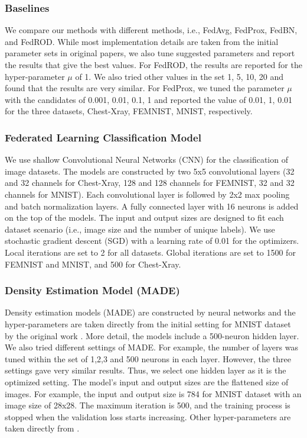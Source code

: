 \subsubsection{Baselines}
We compare our methods with different methods, i.e., FedAvg, FedProx, FedBN, and FedROD. While most implementation details are taken from the initial parameter sets in original papers, we also tune suggested parameters and report the results that give the best values. For FedROD, the results are reported for the hyper-parameter $\mu$ of 1. We also tried other values in the set {1, 5, 10, 20} and found that the results are very similar. For FedProx, we tuned the parameter $\mu$ with the candidates of {0.001, 0.01, 0.1, 1} and reported the value of 0.01, 1, 0.01 for the three datasets, Chest-Xray, FEMNIST, MNIST, respectively. 

\subsubsection{Federated Learning Classification Model} We use shallow Convolutional Neural Networks (CNN) for the classification of image datasets. The models are constructed by two 5x5 convolutional layers (32 and 32 channels for Chest-Xray, 128 and 128 channels for FEMNIST, 32 and 32 channels for MNIST). Each convolutional layer is followed by 2x2 max pooling and batch normalization layers. A fully connected layer with 16 neurons is added on the top of the models. The input and output sizes are designed to fit each dataset scenario (i.e., image size and the number of unique labels). We use stochastic gradient descent (SGD) with a learning rate of 0.01 for the optimizers. Local iterations are set to 2 for all datasets. Global iterations are set to 1500 for FEMNIST and MNIST, and 500 for Chest-Xray. 

\subsubsection{Density Estimation Model (MADE)} Density estimation models (MADE) are constructed by neural networks and the hyper-parameters are taken directly from the initial setting for MNIST dataset by the original work \cite{MADE}. More detail, the models include a 500-neuron hidden layer. We also tried different settings of MADE. For example, the number of layers was tuned within the set of {1,2,3} and 500 neurons in each layer. However, the three settings gave very similar results. Thus, we select one hidden layer as it is the optimized setting. The model's input and output sizes are the flattened size of images. For example, the input and output size is 784 for MNIST dataset with an image size of 28x28. The maximum iteration is 500, and the training process is stopped when the validation loss starts increasing. Other hyper-parameters are taken directly from \cite{MADE}.

